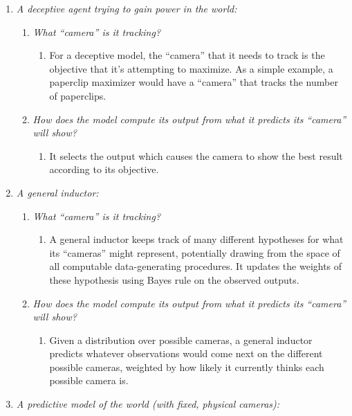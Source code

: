 \documentclass[
  twocolumn,
  natbib,
]{miri-tech-article}
\begin{document}
\begin{enumerate}
\begin{enumerate}
\begin{enumerate}
        \end{enumerate}
    \end{enumerate}
\item \textit{A deceptive agent trying to gain power in the world:}
    \begin{enumerate}
    \item \textit{What ``camera'' is it tracking?}
        \begin{enumerate}
        \item For a deceptive model, the ``camera'' that it needs to track is the objective that it's attempting to maximize. As a simple example, a paperclip maximizer would have a ``camera'' that tracks the number of paperclips.
        \end{enumerate}
    \item \textit{How does the model compute its output from what it predicts its ``camera'' will show?}
        \begin{enumerate}
        \item It selects the output which causes the camera to show the best result according to its objective.
        \end{enumerate}
    \end{enumerate}
\item \textit{A general inductor:}
    \begin{enumerate}
    \item \textit{What ``camera'' is it tracking?}
        \begin{enumerate}
        \item A general inductor keeps track of many different hypotheses for what its ``cameras'' might represent, potentially drawing from the space of all computable data-generating procedures. It updates the weights of these hypothesis using Bayes rule on the observed outputs.
        \end{enumerate}
    \item \textit{How does the model compute its output from what it predicts its ``camera'' will show?}
        \begin{enumerate}
        \item Given a distribution over possible cameras, a general inductor predicts whatever observations would come next on the different possible cameras, weighted by how likely it currently thinks each possible camera is.
        \end{enumerate}
    \end{enumerate}
\item \textit{A predictive model of the world (with fixed, physical cameras):}

\end{enumerate}
\end{document}
